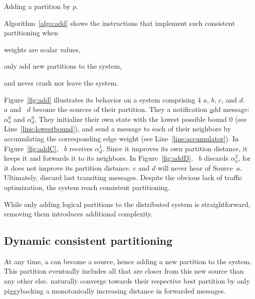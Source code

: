 \begin{algorithm}
  
  \caption{\label{algo:add}Adding a partition by \Process $p$.}
\end{algorithm}

 

Algorithm~\ref{algo:add} shows the instructions that implement such
consistent partitioning when
\begin{inparaenum}[(i)]
\item weights are scalar values,
\item \processes only add new partitions to the system,
\item and \processes never crash nor leave the system.
\end{inparaenum}
Figure~\ref{fig:add} illustrates its behavior on a system comprising 4
\processes $a$, $b$, $c$, and $d$. \Process~$a$ and \Process~$d$
become the sources of their partition. They \NAMEB a notification
\underline{a}dd message: $\alpha_a^0$ and $\alpha_d^0$. They
initialize their own state with the lowest possible bound $0$ (see
Line~\ref{line:lowestbound}), and send a message to each of their
neighbors by accumulating the corresponding edge weight (see
Line~\ref{line:accumulator}). In Figure~\ref{fig:addC}, \Process~$b$
receives $\alpha_{d}^{1}$. Since it improves its own partition
distance, it keeps it and forwards it to its neighbors. In
Figure~\ref{fig:addD}, \Process~$b$ discards $\alpha_{a}^{2}$, for it
does not improve its partition distance. \Processes $c$ and $d$ will
never hear of Source~$a$. Ultimately, \processes discard last
transiting messages. Despite the obvious lack of traffic optimization,
the system reach consistent partitioning.

While only adding logical partitions to the distributed system is
straightforward, removing them introduces additional complexity.

\subsection{Dynamic consistent partitioning}
\label{subsec:dynamic}

At any time, a \process can become a source, hence adding a new
partition to the system. This partition eventually includes all
\processes that are closer from this new source than any other
else. \Processes naturally converge towards their respective best
partition by only piggybacking a monotonically increasing distance in
forwarded messages.

